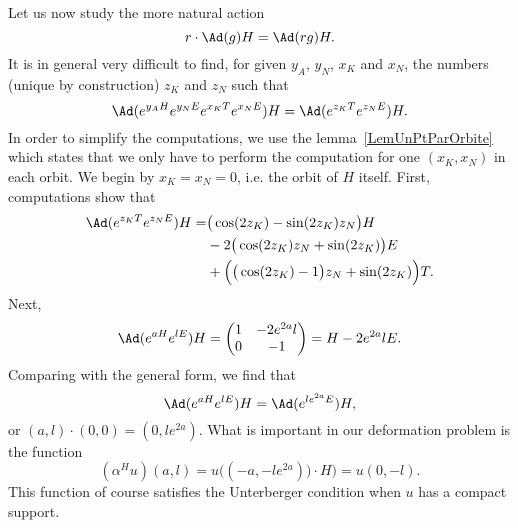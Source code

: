 Let us now study the more natural action
\begin{equation}
	r\cdot \Ad(g)H=\Ad(rg)H.
\end{equation}
It is in general very difficult to find, for given $y_A$, $y_N$, $x_K$ and $x_N$, the numbers (unique by construction) $z_K$ and $z_N$ such that
\[
	\Ad( e^{y_AH} e^{y_NE} e^{x_KT} e^{x_NE})H=\Ad( e^{z_KT} e^{z_NE})H.
\]
In order to simplify the computations, we use the lemma~\ref{LemUnPtParOrbite} which states that we only have to perform the computation for one $(x_K,x_N)$ in each orbit. We begin by $x_K=x_N=0$, i.e. the orbit of $H$ itself. First, computations show that
\[
	\begin{split}
		\Ad( e^{z_KT} e^{z_NE})H=&\big( \cos(2z_K)-\sin(2z_K)z_N \big)H\\
		&-2\big( \cos(2z_K)z_N+\sin(2z_K) \big)E\\
		&+\Big( \big( \cos(2z_K)-1 \big)z_N+\sin(2z_K) \Big)T.
	\end{split}
\]
Next,
\[
	\Ad( e^{aH} e^{lE})H=\begin{pmatrix}
		1 & -2 e^{2a}l \\
		0 & -1
	\end{pmatrix}
	=H-2 e^{2a}lE.
\]
Comparing with the general form, we find that
\begin{equation}
	\Ad( e^{aH} e^{lE})H=\Ad( e^{l e^{2a}E})H,
\end{equation}
or $(a,l)\cdot (0,0)=(0,l e^{2a})$. What is important in our deformation problem is the function
\[
	(\alpha^Hu)(a,l)=u\big( (-a,-l e^{2a}))\cdot H \big)=u(0,-l).
\]
This function of course satisfies the Unterberger condition when $u$ has a compact support.

